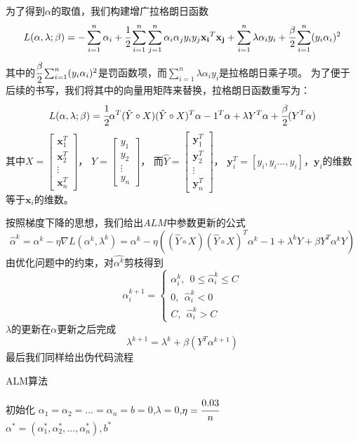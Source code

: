\documentclass{article}
\begin{document}
为了得到$\alpha$的取值，我们构建增广拉格朗日函数
$$L(\alpha,\lambda;\beta)=-\sum_{i=1}^n \alpha_i+\cfrac{1}{2}\sum_{i=1}^{n} \sum_{j=1}^n\alpha_i\alpha_jy_iy_j\mathbf{x_i}^T\mathbf{x_j}+\sum_{i=1}^{n}\lambda\alpha_iy_i+\cfrac{\beta}{2}\sum_{i=1}^{n}(y_i\alpha_i)^2$$
其中的$\cfrac{\beta}{2}\sum_{i=1}^{n}(y_i\alpha_i)^2$是罚函数项，而$\sum_{i=1}^{n}\lambda\alpha_iy_i$是拉格朗日乘子项。
为了便于后续的书写，我们将其中的向量用矩阵来替换，拉格朗日函数重写为：
$$L(\alpha,\lambda;\beta)=\cfrac{1}{2}\alpha^T(\hat{Y}\circ X)(\hat{Y}\circ X)^T\alpha-1^T\alpha+\lambda Y^T\alpha+\cfrac{\beta}{2}(Y^T\alpha)$$
其中$X=\begin{bmatrix}\mathbf{x}_1^T\\\mathbf{x}_2^T\\\vdots\\\mathbf{x}_n^T\end{bmatrix}$，
$Y=\begin{bmatrix}y_1\\y_2\\\vdots \\y_n\end{bmatrix}$，
而$\hat{Y}=\begin{bmatrix}\mathbf{y}_1^T\\\mathbf{y}_2^T\\\vdots\\\mathbf{y}_n^T\end{bmatrix}$，
$\mathbf{y}_i^T=[y_i,y_i\dots,y_i]$，$\mathbf{y}_i$的维数等于$\mathbf{x}_i$的维数。

按照梯度下降的思想，我们给出$ALM$中参数更新的公式
$$\hat{\alpha}^k=\alpha^k-\eta\nabla L(\alpha^k,\lambda^k)=\alpha^k-\eta((\hat{Y}\circ X)(\hat{Y}\circ X)^T\alpha^k-1+\lambda^kY+\beta Y^T\alpha^kY)$$
由优化问题中的约束，对$\hat{\alpha^k}$剪枝得到
$$\alpha_i^{k+1}=\begin{cases}\alpha_i^k,\ \ 0\leq\hat{\alpha}_i^k\leq C\\
0,\ \ \hat{\alpha}_i^k<0\\
C, \ \ \hat{\alpha}_i^k>C \end{cases}$$
$\lambda$的更新在$\alpha$更新之后完成
$$\lambda^{k+1}=\lambda^k+\beta(Y^T\alpha^{k+1})$$
最后我们同样给出伪代码流程

\begin{algorithm}[H]
    \caption{ALM算法}
    初始化 $\alpha_1= \alpha_2 = \dots = \alpha_n = b = 0$,$\lambda=0$,$\eta=\cfrac{0.03}{n}$\\
    \Return $\alpha^{*} = (\alpha_1^{*},\alpha_2^{*},\dots,\alpha_n^{*}), b^{*}$
\end{algorithm} 
\end{document}
